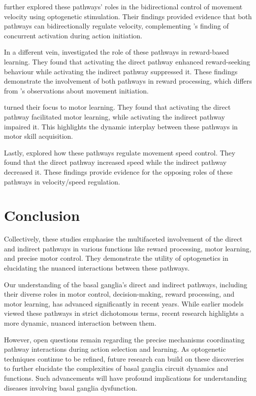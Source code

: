 \documentclass[10pt]{article}
\begin{document}
\begin{sloppypar}
  \cite{yttri_opponent_2016} further explored these pathways’ roles in the bidirectional control of movement velocity using optogenetic stimulation. Their findings provided evidence that both pathways can bidirectionally regulate velocity, complementing \cite{cui_concurrent_2013}’s finding of concurrent activation during action initiation.

  In a different vein, \cite{guillaumin_optogenetic_2020} investigated the role of these pathways in reward-based learning. They found that activating the direct pathway enhanced reward-seeking behaviour while activating the indirect pathway suppressed it. These findings demonstrate the involvement of both pathways in reward processing, which differs from \cite{cui_concurrent_2013}’s observations about movement initiation.

  \cite{hilt_evidence_2016} turned their focus to motor learning. They found that activating the direct pathway facilitated motor learning, while activating the indirect pathway impaired it. This highlights the dynamic interplay between these pathways in motor skill acquisition.

  Lastly, \cite{wang_direct_2015} explored how these pathways regulate movement speed control. They found that the direct pathway increased speed while the indirect pathway decreased it. These findings provide evidence for the opposing roles of these pathways in velocity/speed regulation.

  \section{Conclusion}
  \label{sec:conclusion}

  Collectively, these studies emphasise the multifaceted involvement of the direct and indirect pathways in various functions like reward processing, motor learning, and precise motor control. They demonstrate the utility of optogenetics in elucidating the nuanced interactions between these pathways.

  Our understanding of the basal ganglia’s direct and indirect pathways, including their diverse roles in motor control, decision-making, reward processing, and motor learning, has advanced significantly in recent years. While earlier models viewed these pathways in strict dichotomous terms, recent research highlights a more dynamic, nuanced interaction between them.

  However, open questions remain regarding the precise mechanisms coordinating pathway interactions during action selection and learning. As optogenetic techniques continue to be refined, future research can build on these discoveries to further elucidate the complexities of basal ganglia circuit dynamics and functions. Such advancements will have profound implications for understanding diseases involving basal ganglia dysfunction.


\end{sloppypar}
\end{document}
